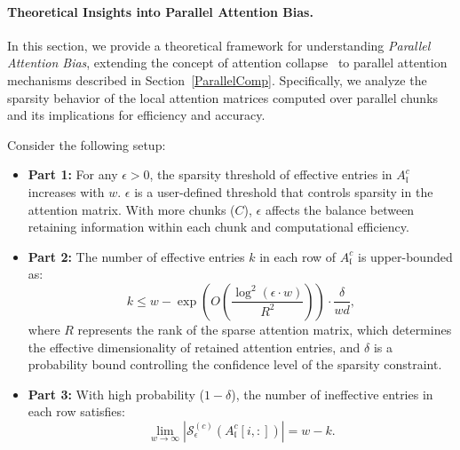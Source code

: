 \paragraph{Theoretical Insights into Parallel Attention Bias.}\label{sec:parallel_attn_collapse}

In this section, we provide a theoretical framework for understanding \textit{Parallel Attention Bias}, extending the concept of attention collapse~\citep{dong2021attention} to parallel attention mechanisms described in Section~\ref{ParallelComp}. Specifically, we analyze the sparsity behavior of the local attention matrices computed over parallel chunks and its implications for efficiency and accuracy.

\begin{theorem}\label{thm:parallel_attn_collapse_main}
    Consider the following setup:
      \vspace{-2mm}
    \begin{itemize}
        \item {\bf Part 1:} For any \(\epsilon > 0\), the sparsity threshold of effective entries in \(A^{c}_\mathfrak{l}\) increases with \(w\). \( \epsilon \) is a user-defined threshold that controls sparsity in the attention matrix. With more chunks (\( C \)), \( \epsilon \) affects the balance between retaining information within each chunk and computational efficiency.
        \item {\bf Part 2:} The number of effective entries \(k\) in each row of \(A^{c}_\mathfrak{l}\) is upper-bounded as: 
        \[
        k \leq w - \exp\left(O\left(\frac{\log^2(\epsilon \cdot w)}{R^2}\right)\right) \cdot \frac{\delta}{wd},
        \] where \(R\) represents the rank of the sparse attention matrix, which determines the effective dimensionality of retained attention entries, and \(\delta\) is a probability bound controlling the confidence level of the sparsity constraint. 
        
        \item {\bf Part 3:} With high probability (\(1 - \delta\)), the number of ineffective entries in each row satisfies:
        \[
        \lim_{w \to \infty} | \mathcal{S}_\epsilon^{(c)}(A^{c}_\mathfrak{l}[i,:]) | = w - k.
        \]
    \end{itemize}
\end{theorem}

